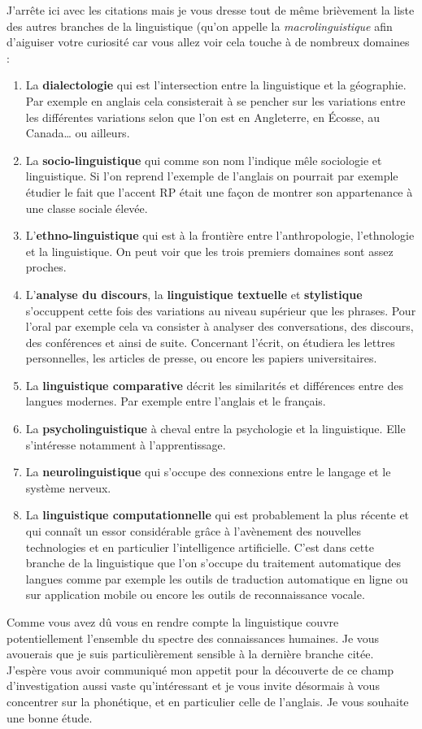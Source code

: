 J'arrête ici avec les citations mais je vous dresse tout de même
brièvement la liste des autres branches de la linguistique (qu'on
appelle la \emph{macrolinguistique} afin d'aiguiser votre curiosité
car vous allez voir cela touche à de nombreux domaines :
\begin{enumerate}
\item La \textbf{dialectologie} qui est l'intersection entre la
  linguistique et la géographie. Par exemple en anglais cela
  consisterait à se pencher sur les variations entre les différentes
  variations selon que l'on est en Angleterre, en \'Ecosse, au
  Canada\dots{} ou ailleurs.
\item La \textbf{socio-linguistique} qui comme son nom l'indique mêle
  sociologie et linguistique. Si l'on reprend l'exemple de l'anglais
  on pourrait par exemple étudier le fait que l'accent RP était une
  façon de montrer son appartenance à une classe sociale élevée.
\item L'\textbf{ethno-linguistique} qui est à la frontière entre
  l'anthropologie, l'ethnologie et la linguistique. On peut voir que les
  trois premiers domaines sont assez proches.
\item L'\textbf{analyse du discours}, la \textbf{linguistique
    textuelle} et \textbf{stylistique} s'occuppent cette fois des
  variations au niveau supérieur que les phrases. Pour l'oral par
  exemple cela va consister à analyser des conversations, des
  discours, des conférences et ainsi de suite. Concernant l'écrit, on
  étudiera les lettres personnelles, les articles de presse, ou encore
  les papiers universitaires.
\item La \textbf{linguistique comparative} décrit les similarités et
  différences entre des langues modernes. Par exemple entre l'anglais
  et le français.
\item La \textbf{psycholinguistique} à cheval entre la psychologie et
  la linguistique. Elle s'intéresse notamment à l'apprentissage.
\item La \textbf{neurolinguistique} qui s'occupe des connexions entre
  le langage et le système nerveux.
\item La \textbf{linguistique computationnelle} qui est probablement
  la plus récente et qui connaît un essor considérable grâce à
  l'avènement des nouvelles technologies et en particulier
  l'intelligence artificielle. C'est dans cette branche de la
  linguistique que l'on s'occupe du traitement automatique des langues
  comme par exemple les outils de traduction automatique en ligne ou
  sur application mobile ou encore les outils de reconnaissance
  vocale.   
\end{enumerate}

Comme vous avez dû vous en rendre compte la linguistique couvre
potentiellement l'ensemble du spectre des connaissances humaines. Je
vous avouerais que je suis particulièrement sensible à la dernière
branche citée. J'espère vous avoir communiqué mon appetit pour la
découverte de ce champ d'investigation aussi vaste qu'intéressant et
je vous invite désormais à vous concentrer sur la phonétique, et en
particulier celle de l'anglais. Je vous souhaite une bonne étude. 
